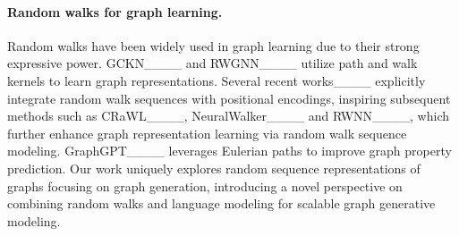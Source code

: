 \vspace{-.1in}
\paragraph{Random walks for graph learning.}
Random walks have been widely used in graph learning due to their strong expressive power. GCKN____ and RWGNN____ utilize path and walk kernels to learn graph representations. Several recent works____ explicitly integrate random walk sequences with positional encodings, inspiring subsequent methods such as CRaWL____, NeuralWalker____ and RWNN____, which further enhance graph representation learning via random walk sequence modeling. GraphGPT____ leverages Eulerian paths to improve graph property prediction. Our work uniquely explores random sequence representations of graphs focusing on graph generation, introducing a novel perspective on combining random walks and language modeling for scalable graph generative modeling.
